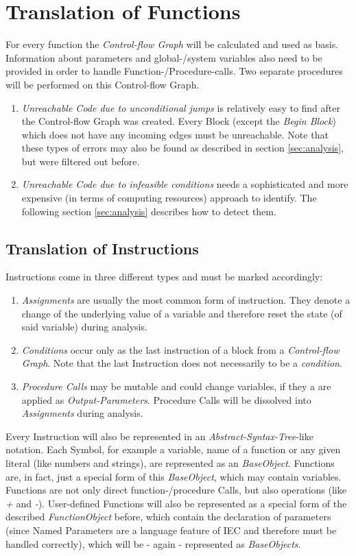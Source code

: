 \section{Translation of Functions}
\label{sec:translation}
For every function the \emph{Control-flow Graph} will be calculated and used as basis. Information about parameters and global-/system variables also need to be provided in order to handle Function-/Procedure-calls. 
Two separate procedures will be performed on this Control-flow Graph.
\begin{enumerate}
	\item \emph{Unreachable Code due to unconditional jumps} is relatively easy to find after the Control-flow Graph was created. Every Block (except the \emph{Begin Block}) which does not have any incoming edges must be unreachable.
		Note that these types of errors may also be found as described in section \ref{sec:analysis}, but were filtered out before.
	\item \emph{Unreachable Code due to infeasible conditions} needs a sophisticated and more expensive (in terms of computing resources) approach to identify. The following section \ref{sec:analysis} describes how to detect them.
\end{enumerate}
\subsection{Translation of Instructions}
Instructions come in three different types and must be marked accordingly:
\begin{enumerate}
	\item \emph{Assignments} are usually the most common form of instruction. They denote a change of the underlying value of a variable and therefore reset the state (of said variable) during analysis. 
	\item \emph{Conditions} occur only as the last instruction of a block from a \emph{Control-flow Graph}. Note that the last Instruction does not necessarily to be a \emph{condition}.
	\item \emph{Procedure Calls} may be mutable and could change variables, if they a are applied as \emph{Output-Parameters}. Procedure Calls will be dissolved into \emph{Assignments} during analysis.
\end{enumerate}
Every Instruction will also be represented in an \emph{Abstract-Syntax-Tree}-like notation. Each Symbol, for example a variable, name of a function or any given literal (like numbers and strings), are represented as an \emph{BaseObject}. Functions are, in fact, just a special form of this \emph{BaseObject}, which may contain variables. Functions are not only direct function-/procedure Calls, but also operations (like \emph{+} and \emph{-}). User-defined Functions will also be represented as a special form of the described \emph{FunctionObject} before, which contain the declaration of parameters (since Named Parameters are a language feature of IEC and therefore must be handled correctly), which will be - again - represented as \emph{BaseObjects}. 
 


